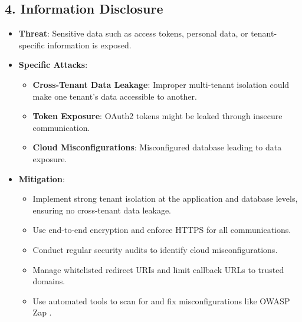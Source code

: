 \subsection*{4. Information Disclosure}
\begin{itemize}
    \item \textbf{Threat}: Sensitive data such as access tokens, personal data, or tenant-specific information is exposed.
    \item \textbf{Specific Attacks}:
    \begin{itemize}
        \item \textbf{Cross-Tenant Data Leakage}: Improper multi-tenant isolation could make one tenant’s data accessible to another.
        \item \textbf{Token Exposure}: OAuth2 tokens might be leaked through insecure communication.
        \item \textbf{Cloud Misconfigurations}: Misconfigured database leading to data exposure.
    \end{itemize}
    \item \textbf{Mitigation}:
    \begin{itemize}
        \item Implement strong tenant isolation at the application and database levels, ensuring no cross-tenant data leakage.
        \item Use end-to-end encryption and enforce HTTPS for all communications.
        \item Conduct regular security audits to identify cloud misconfigurations.
        \item Manage whitelisted redirect URIs and limit callback URLs to trusted domains.
        \item Use automated tools to scan for and fix misconfigurations like OWASP Zap \citep{owasp_zap}.
    \end{itemize}
\end{itemize}

